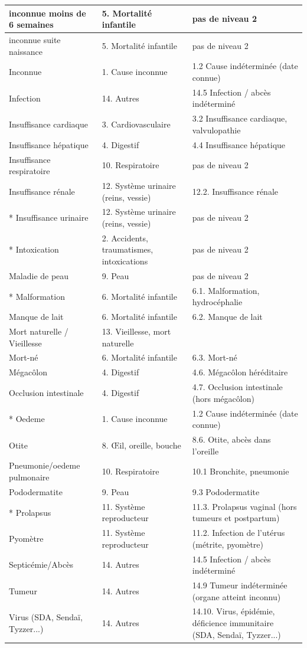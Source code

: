 \documentclass[a4paper,10pt]{article}
\begin{document}
\begin{tabular}{|l|p{6cm}|p{5.75cm}|}
inconnue moins de 6 semaines & 5. Mortalité infantile & pas de niveau 2\\\hline
inconnue suite naissance & 5. Mortalité infantile & pas de niveau 2\\\hline
Inconnue & 1. Cause inconnue & 1.2 Cause indéterminée (date connue)\\\hline
Infection & 14. Autres & 14.5 Infection / abcès indéterminé\\\hline
Insuffisance cardiaque & 3. Cardiovasculaire & 3.2 Insuffisance cardiaque, valvulopathie\\\hline
Insuffisance hépatique & 4. Digestif & 4.4 Insuffisance hépatique\\\hline
Insuffisance respiratoire & 10. Respiratoire & pas de niveau 2\\\hline
Insuffisance rénale & 12. Système urinaire (reins, vessie) & 12.2. Insuffisance rénale\\\hline
* Insuffisance urinaire & 12. Système urinaire (reins, vessie) & pas de niveau 2\\\hline
* Intoxication & 2. Accidents, traumatismes, intoxications & pas de niveau 2\\\hline
Maladie de peau & 9. Peau & pas de niveau 2\\\hline
* Malformation & 6. Mortalité infantile & 6.1.   	Malformation, hydrocéphalie\\\hline
Manque de lait & 6. Mortalité infantile & 6.2. Manque de lait\\\hline
Mort naturelle / Vieillesse & 13. Vieillesse, mort naturelle &\\\hline
Mort-né & 6. Mortalité infantile & 6.3. Mort-né\\\hline
Mégacôlon & 4. Digestif & 4.6. Mégacôlon héréditaire\\\hline
Occlusion intestinale & 4. Digestif & 4.7. Occlusion intestinale (hors mégacôlon)\\\hline
* Oedeme & 1. Cause inconnue & 1.2 Cause indéterminée (date connue)\\\hline
Otite & 8. Œil, oreille, bouche & 8.6. Otite, abcès dans l'oreille\\\hline
Pneumonie/oedeme pulmonaire & 10. Respiratoire & 10.1 Bronchite, pneumonie\\\hline
Pododermatite & 9. Peau & 9.3 Pododermatite\\\hline
* Prolapsus & 11. Système reproducteur & 11.3. Prolapsus vaginal (hors tumeurs et postpartum)\\\hline
Pyomètre & 11. Système reproducteur & 11.2.  Infection de l'utérus (métrite, pyomètre)\\\hline
Septicémie/Abcès & 14. Autres & 14.5 Infection / abcès indéterminé\\\hline
Tumeur & 14. Autres & 14.9 Tumeur indéterminée (organe atteint inconnu)\\\hline
Virus (SDA, Sendaï, Tyzzer...) & 14. Autres & 14.10. Virus, épidémie, déficience immunitaire (SDA, Sendaï, Tyzzer...)\\\hline
\end{tabular}
\normalsize
\end{document}
